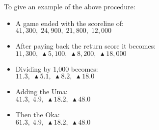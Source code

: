 To give an example of the above procedure:
\begin{itemize}
	\item A game ended with the scoreline of: \\ \(41,300,\; 24,900,\; 21,800,\; 12,000\)
	\item After paying back the return score it becomes: \\ \(11,300,\; \blacktriangle 5,100,\; \blacktriangle 8,200,\; \blacktriangle 18,000\)
	\item Dividing by 1,000 becomes: \\ \(11.3, \; \blacktriangle 5.1, \; \blacktriangle 8.2, \; \blacktriangle 18.0\) 
	\item Adding the Uma: \\ \(41.3, \; 4.9, \; \blacktriangle 18.2, \; \blacktriangle 48.0\) 
	\item Then the Oka: \\ \(61.3, \; 4.9, \; \blacktriangle 18.2, \; \blacktriangle 48.0\) 
\end{itemize}